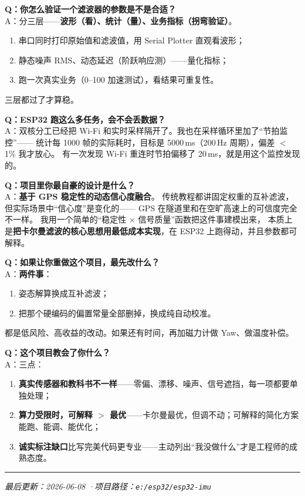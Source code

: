 \documentclass[UTF8,11pt,a4paper]{ctexart}
\begin{document}
\begin{followup}
\textbf{Q：你怎么验证一个滤波器的参数是不是合适？}\\
A：分三层——\textbf{波形（看）、统计（量）、业务指标（拐弯验证）}。
\begin{enumerate}[leftmargin=1.4em,topsep=2pt,itemsep=1pt]
  \item 串口同时打印原始值和滤波值，用 Serial Plotter 直观看波形；
  \item 静态噪声 RMS、动态延迟（阶跃响应测）——量化指标；
  \item 跑一次真实业务（0--100 加速测试），看结果可重复性。
\end{enumerate}
三层都过了才算稳。

\medskip
\textbf{Q：ESP32 跑这么多任务，会不会丢数据？}\\
A：双核分工已经把 Wi-Fi 和实时采样隔开了。我也在采样循环里加了``节拍监控''——
统计每 1000 帧的实际耗时，目标是 5000\,ms（200\,Hz 周期），偏差 $<$ 1\% 我才放心。
有一次发现 Wi-Fi 重连时节拍偏移了 20\,ms，就是用这个监控发现的。

\medskip
\textbf{Q：项目里你最自豪的设计是什么？}\\
A：\textbf{基于 GPS 稳定性的动态信心度融合}。
传统教程都讲固定权重的互补滤波，但实际场景中``信心度''是变化的——
GPS 在隧道里和在空旷高速上的可信度完全不一样。
我用一个简单的``稳定性 $\times$ 信号质量''函数把这件事建模出来，
本质上是\textbf{把卡尔曼滤波的核心思想用最低成本实现}，在 ESP32 上跑得动，并且参数都可解释。

\medskip
\textbf{Q：如果让你重做这个项目，最先改什么？}\\
A：\textbf{两件事}：
\begin{enumerate}[leftmargin=1.4em,topsep=2pt,itemsep=1pt]
  \item 姿态解算换成互补滤波；
  \item 把那个硬编码的偏置常量全部删掉，换成纯自动校准。
\end{enumerate}
都是低风险、高收益的改动。如果还有时间，再加磁力计做 Yaw、做温度补偿。

\medskip
\textbf{Q：这个项目教会了你什么？}\\
A：三点：
\begin{enumerate}[leftmargin=1.4em,topsep=2pt,itemsep=1pt]
  \item \textbf{真实传感器和教科书不一样}——零偏、漂移、噪声、信号遮挡，每一项都要单独处理；
  \item \textbf{算力受限时，可解释 $>$ 最优}——卡尔曼最优，但调不动；可解释的简化方案能跑、能调、能优化；
  \item \textbf{诚实标注缺口}比写完美代码更专业——主动列出``我没做什么''才是工程师的成熟态度。
\end{enumerate}
\end{followup}

\vfill
\hrule
\smallskip
\noindent\textit{\small 最后更新：2026-06-08 \quad·\quad 项目路径：\texttt{e:/esp32/esp32-imu}}
\end{document}
